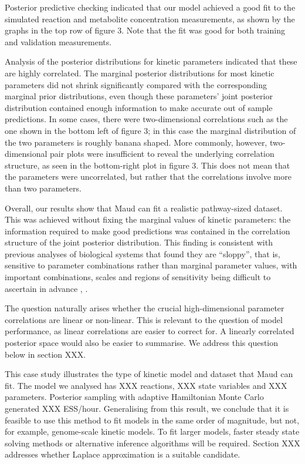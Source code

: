 \documentclass[journal=,manuscript=]{achemso}
\begin{document}
Posterior predictive checking indicated that our model achieved a good
fit to the simulated reaction and metabolite concentration measurements,
as shown by the graphs in the top row of figure 3. Note that the fit was
good for both training and validation measurements.

Analysis of the posterior distributions for kinetic parameters indicated
that these are highly correlated. The marginal posterior distributions
for most kinetic parameters did not shrink significantly compared with
the corresponding marginal prior distributions, even though these
parameters' joint posterior distribution contained enough information to
make accurate out of sample predictions. In some cases, there were
two-dimensional correlations such as the one shown in the bottom left of
figure 3; in this case the marginal distribution of the two parameters
is roughly banana shaped. More commonly, however, two-dimensional pair
plots were insufficient to reveal the underlying correlation structure,
as seen in the bottom-right plot in figure 3. This does not mean that
the parameters were uncorrelated, but rather that the correlations
involve more than two parameters.

Overall, our results show that Maud can fit a realistic pathway-sized
dataset. This was achieved without fixing the marginal values of kinetic
parameters: the information required to make good predictions was
contained in the correlation structure of the joint posterior
distribution. This finding is consistent with previous analyses of
biological systems that found they are ``sloppy'', that is, sensitive to
parameter combinations rather than marginal parameter values, with
important combinations, scales and regions of sensitivity being
difficult to ascertain in advance \citet{gutenkunst_2007},
\citet{poirier_revising_1998}.

The question naturally arises whether the crucial high-dimensional
parameter correlations are linear or non-linear. This is relevant to the
question of model performance, as linear correlations are easier to
correct for. A linearly correlated posterior space would also be easier
to summarise. We address this question below in section XXX.

This case study illustrates the type of kinetic model and dataset that
Maud can fit. The model we analysed has XXX reactions, XXX state
variables and XXX parameters. Posterior sampling with adaptive
Hamiltonian Monte Carlo generated XXX ESS/hour. Generalising from this
result, we conclude that it is feasible to use this method to fit models
in the same order of magnitude, but not, for example, genome-scale
kinetic models. To fit larger models, faster steady state solving
methods or alternative inference algorithms will be required. Section
XXX addresses whether Laplace approximation is a suitable candidate.
\end{document}
